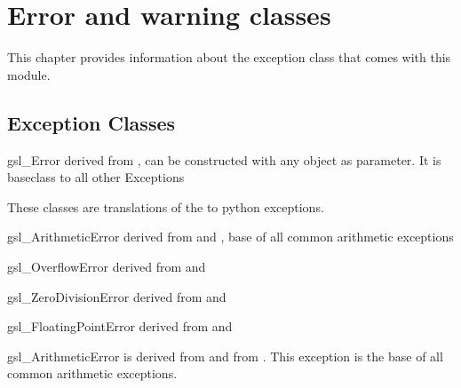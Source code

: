\chapter[\protect\module{pygsl.errors} --- Error and warning classes]
{\protect{} \\ Error and warning classes} 
\label{cha:error-module}

This chapter provides information about the  exception class that comes with this module.

\section{Exception Classes}


\begin{excclassdesc} {gsl_Error}{}
derived from , can be constructed with any object as parameter.
It is baseclass to all other \gsl{} Exceptions
\end{excclassdesc}
These classes are translations of the  to python
exceptions.


\begin{excclassdesc}{gsl_ArithmeticError}{}
derived from  and ,
base of all common arithmetic exceptions
\end{excclassdesc}

\begin{excclassdesc}{gsl_OverflowError}{}
derived from  and 
\end{excclassdesc}

\begin{excclassdesc}{gsl_ZeroDivisionError}{}
derived from  and 
\end{excclassdesc}

\begin{excclassdesc}{gsl_FloatingPointError}{}
derived from  and 
\end{excclassdesc}

\begin{excclassdesc}{gsl_ArithmeticError}{}
is derived from   and from   .
This exception is the    base of all common arithmetic exceptions.
\end{excclassdesc}

